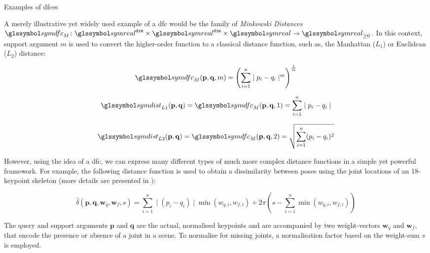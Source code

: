 \begin{example}[label=example:dfc]{Examples of \acrlong{dfc}es}{}

    A merely illustrative yet widely used example of a \acrshort{dfc} would be the family of \emph{Minkowski Distances} $\symdfc_{M} \colon \symreal^{\mathtt{dim}} \times \symreal^{\mathtt{dim}} \times \symreal \to \symreal_{\geq 0}$. In this context, support argument $m$ is used to convert the higher-order function to a classical distance function, such as, the Manhattan ($L_1$) or Euclidean ($L_2$) distance:

    \begin{equation}
        \symdfc_{M}(\mathbf{p},\mathbf{q},m) = \left(\sum_{i=1}^{n} \mid p_i - q_i \mid^m\right)^{\frac{1}{m}}
    \end{equation}
    
    \begin{equation}
       \symdist_{L1}(\mathbf{p},\mathbf{q}) = \symdfc_M(\mathbf{p},\mathbf{q}, 1) = \sum_{i=1}^{n} \mid p_i - q_i \mid
    \end{equation}
    
    \begin{equation}
       \symdist_{L2}(\mathbf{p},\mathbf{q}) =\symdfc_M(\mathbf{p},\mathbf{q}, 2) = \sqrt{\sum_{i=1}^{n} (p_i - q_i)^2}
    \end{equation}
    
    However, using the idea of a \acrshort{dfc}, we can express many different types of much more complex distance functions in a simple yet powerful framework. For example, the following distance function is used to obtain a dissimilarity between poses using the joint locations of an 18-keypoint skeleton (more details are presented in \cite{Heller:2022Multi}):

    \begin{equation}
        \hat{\delta}(\mathbf{p},\mathbf{q},\mathbf{w}_q,\mathbf{w}_f, s) = \sum_{i=1}^{n} \mid (p_i - q_i) \mid \min(w_{q,i}, w_{f,i}) + 2\pi (s - \sum_{i=1}^{n} \min(w_{q,i}, w_{f,i}))
    \end{equation}

    The query and support arguments $\mathbf{p}$ and $\mathbf{q}$ are the actual, normalised keypoints and are accompanied by two weight-vectors $\mathbf{w}_q$ and $\mathbf{w}_f$, that encode the presence or absence of a joint in a scene. To normalise for missing joints, a normalisation factor based on the weight-sum $s$ is employed.
\end{example}



